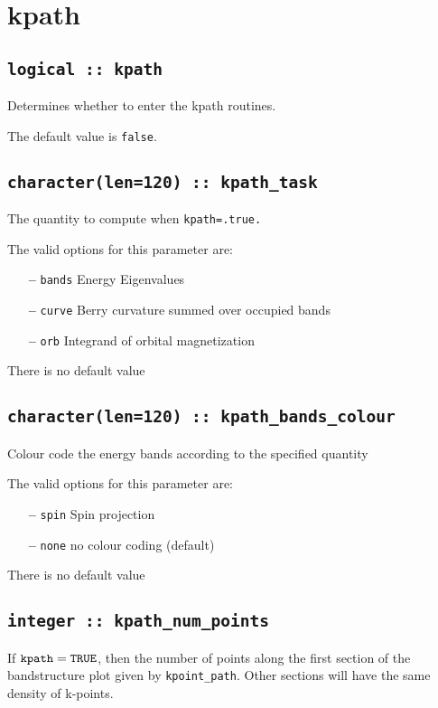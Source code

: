 \section{kpath}

\subsection[berry]{\tt logical :: kpath}
Determines whether to enter the kpath routines.

The default value is \verb#false#.


\subsection[kpath\_task]{\tt character(len=120) ::  kpath\_task} 
The quantity to compute when {\tt kpath=.true.} 

The valid options for this parameter are:
\begin{itemize}
\item[{\bf --}]  \verb#bands# Energy Eigenvalues
\item[{\bf --}]  \verb#curve# Berry curvature summed over occupied bands
\item[{\bf --}] \verb#orb#  Integrand of orbital magnetization
\end{itemize}
There is no default value

\subsection[kpath\_colour]{\tt character(len=120) ::  kpath\_bands\_colour}
Colour code the energy bands according to the specified quantity

The valid options for this parameter are:
\begin{itemize}
\item[{\bf --}]  \verb#spin# Spin projection
\item[{\bf --}]  \verb#none# no colour coding (default)
\end{itemize}
There is no default value


\subsection[kpath\_num\_points]{\tt integer :: kpath\_num\_points}

If $\verb#kpath#=\verb#TRUE#$, then the number of points along
the first section of the bandstructure plot given by
\verb#kpoint_path#. Other sections will have the same density of
k-points. 

